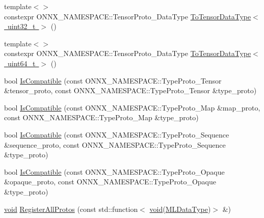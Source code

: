 \begin{DoxyCompactItemize}
\item 
{\footnotesize template$<$$>$ }\\constexpr O\+N\+N\+X\+\_\+\+N\+A\+M\+E\+S\+P\+A\+C\+E\+::\+Tensor\+Proto\+\_\+\+Data\+Type \mbox{\hyperlink{namespaceonnxruntime_1_1data__types__internal_aef5850c0443fb08be7d201ba2fc8b945}{To\+Tensor\+Data\+Type$<$ uint32\+\_\+t $>$}} ()
\item 
{\footnotesize template$<$$>$ }\\constexpr O\+N\+N\+X\+\_\+\+N\+A\+M\+E\+S\+P\+A\+C\+E\+::\+Tensor\+Proto\+\_\+\+Data\+Type \mbox{\hyperlink{namespaceonnxruntime_1_1data__types__internal_aadf5ee07a814f7fdb0db09472dbf9006}{To\+Tensor\+Data\+Type$<$ uint64\+\_\+t $>$}} ()
\item 
bool \mbox{\hyperlink{namespaceonnxruntime_1_1data__types__internal_a9099f278b70ba024c5728c05e11897ee}{Is\+Compatible}} (const O\+N\+N\+X\+\_\+\+N\+A\+M\+E\+S\+P\+A\+C\+E\+::\+Type\+Proto\+\_\+\+Tensor \&tensor\+\_\+proto, const O\+N\+N\+X\+\_\+\+N\+A\+M\+E\+S\+P\+A\+C\+E\+::\+Type\+Proto\+\_\+\+Tensor \&type\+\_\+proto)
\item 
bool \mbox{\hyperlink{namespaceonnxruntime_1_1data__types__internal_aece255300cd5b81ed09517ea20130c58}{Is\+Compatible}} (const O\+N\+N\+X\+\_\+\+N\+A\+M\+E\+S\+P\+A\+C\+E\+::\+Type\+Proto\+\_\+\+Map \&map\+\_\+proto, const O\+N\+N\+X\+\_\+\+N\+A\+M\+E\+S\+P\+A\+C\+E\+::\+Type\+Proto\+\_\+\+Map \&type\+\_\+proto)
\item 
bool \mbox{\hyperlink{namespaceonnxruntime_1_1data__types__internal_a44bb8561823e33ae70b877bcd51251c8}{Is\+Compatible}} (const O\+N\+N\+X\+\_\+\+N\+A\+M\+E\+S\+P\+A\+C\+E\+::\+Type\+Proto\+\_\+\+Sequence \&sequence\+\_\+proto, const O\+N\+N\+X\+\_\+\+N\+A\+M\+E\+S\+P\+A\+C\+E\+::\+Type\+Proto\+\_\+\+Sequence \&type\+\_\+proto)
\item 
bool \mbox{\hyperlink{namespaceonnxruntime_1_1data__types__internal_a41fe7f3e42912d2e8db13d576b646120}{Is\+Compatible}} (const O\+N\+N\+X\+\_\+\+N\+A\+M\+E\+S\+P\+A\+C\+E\+::\+Type\+Proto\+\_\+\+Opaque \&opaque\+\_\+proto, const O\+N\+N\+X\+\_\+\+N\+A\+M\+E\+S\+P\+A\+C\+E\+::\+Type\+Proto\+\_\+\+Opaque \&type\+\_\+proto)
\item 
\mbox{\hyperlink{mlasi_8h_a88f941d423cb2a819b70a1358982b1a6}{void}} \mbox{\hyperlink{namespaceonnxruntime_1_1data__types__internal_ada1f3666a57810888a98209550c1cc4b}{Register\+All\+Protos}} (const std\+::function$<$ \mbox{\hyperlink{mlasi_8h_a88f941d423cb2a819b70a1358982b1a6}{void}}(\mbox{\hyperlink{namespaceonnxruntime_ad77d0a6e838ec7da5dc35fed5ee66b49}{M\+L\+Data\+Type}})$>$ \&)
\end{DoxyCompactItemize}


